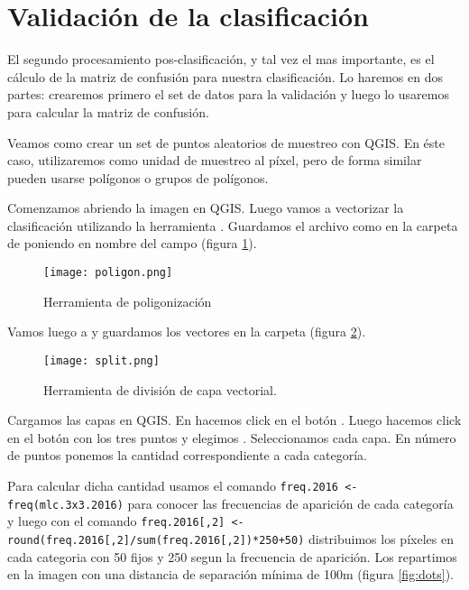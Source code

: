 \section{Validaci\'on de la clasificaci\'on}

El segundo procesamiento pos-clasificaci\'on, y tal vez el mas importante, es el c\'alculo de la matriz de confusi\'on para nuestra clasificaci\'on. Lo haremos en dos partes: crearemos primero el set de datos para la validaci\'on y luego lo usaremos para calcular la matriz de confusi\'on.

\begin{exa}
  Veamos como crear un set de puntos aleatorios de muestreo con QGIS. En \'este caso, utilizaremos como unidad de muestreo al p\'ixel, pero de forma similar pueden usarse pol\'igonos o grupos de pol\'igonos.

  Comenzamos abriendo la imagen  en QGIS. Luego vamos a vectorizar la clasificaci\'on utilizando la herramienta . Guardamos el archivo como  en la carpeta de  poniendo en nombre del campo  (figura \ref{fig:poligon}).

  \begin{figure}[h!]
    \centering
    \texttt{[image: poligon.png]}
    \caption{Herramienta de poligonizaci\'on}
    \label{fig:poligon}
  \end{figure}

  Vamos luego a  y guardamos los vectores en la carpeta  (figura \ref{fig:split}).

  \begin{figure}[h!]
    \centering
    \texttt{[image: split.png]}
    \caption{Herramienta de divisi\'on de capa vectorial.}
    \label{fig:split}
  \end{figure}

  Cargamos las capas en QGIS. En  hacemos click en el bot\'on . Luego hacemos click en el bot\'on con los tres puntos y elegimos .  Seleccionamos cada capa. En n\'umero de puntos ponemos la cantidad correspondiente a cada categor\'ia.

  Para calcular dicha cantidad usamos el comando \texttt{freq.2016 <- freq(mlc.3x3.2016)}  para conocer las frecuencias de aparici\'on de cada categor\'ia y luego con el comando  \texttt{freq.2016[,2] <- round(freq.2016[,2]/sum(freq.2016[,2])*250+50)} distribuimos  los p\'ixeles en cada categoria con 50 fijos y 250 segun la frecuencia de aparici\'on.
  Los repartimos en la imagen con una distancia de separaci\'on m\'inima de 100m (figura \ref{fig:dots}).


\end{exa}
